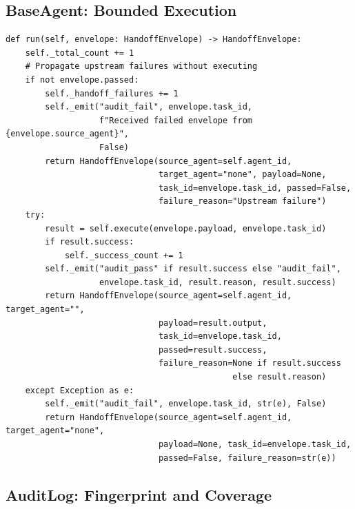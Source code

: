 \documentclass[12pt,letterpaper]{article}
\theoremstyle{definition}
\theoremstyle{remark}
\begin{document}
\subsection{BaseAgent: Bounded Execution}

\begin{noteboxtc}
\begin{lstlisting}[style=pythonstyle, caption={BaseAgent.run() — audit-on-every-action wrapper}, label={lst:baseagent}]
def run(self, envelope: HandoffEnvelope) -> HandoffEnvelope:
    self._total_count += 1
    # Propagate upstream failures without executing
    if not envelope.passed:
        self._handoff_failures += 1
        self._emit("audit_fail", envelope.task_id,
                   f"Received failed envelope from {envelope.source_agent}",
                   False)
        return HandoffEnvelope(source_agent=self.agent_id,
                               target_agent="none", payload=None,
                               task_id=envelope.task_id, passed=False,
                               failure_reason="Upstream failure")
    try:
        result = self.execute(envelope.payload, envelope.task_id)
        if result.success:
            self._success_count += 1
        self._emit("audit_pass" if result.success else "audit_fail",
                   envelope.task_id, result.reason, result.success)
        return HandoffEnvelope(source_agent=self.agent_id, target_agent="",
                               payload=result.output,
                               task_id=envelope.task_id,
                               passed=result.success,
                               failure_reason=None if result.success
                                              else result.reason)
    except Exception as e:
        self._emit("audit_fail", envelope.task_id, str(e), False)
        return HandoffEnvelope(source_agent=self.agent_id, target_agent="none",
                               payload=None, task_id=envelope.task_id,
                               passed=False, failure_reason=str(e))
\end{lstlisting}
\end{noteboxtc}

\subsection{AuditLog: Fingerprint and Coverage}
\end{document}
